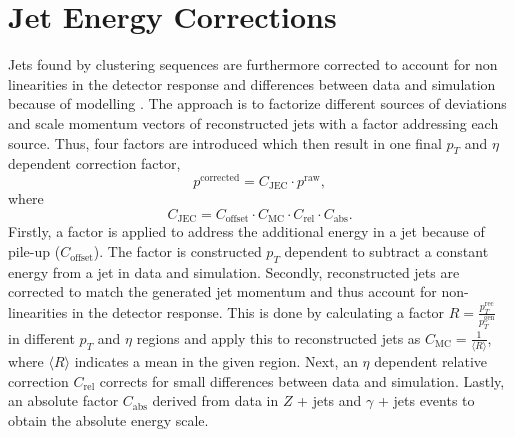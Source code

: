 \section{Jet Energy Corrections}
\label{sec:jec}
	Jets found by clustering sequences are furthermore corrected to account for non linearities in the detector response and differences between data and simulation because of modelling \cite{JEC}. The approach is to factorize different sources of deviations and scale momentum vectors of reconstructed jets with a factor addressing each source. Thus, four factors are introduced which then result in one final $p_T$ and $\eta$ dependent correction factor,
	\begin{equation}
	p^{\text{corrected}} = C_{\text{JEC}} \cdot p^{\text{raw}},
	\label{eq:jec}
	\end{equation}
	where
	\begin{equation}
	C_{\text{JEC}} = C_{\text{offset}} \cdot C_{\text{MC}} \cdot C_{\text{rel}} \cdot C_{\text{abs}}.
	\label{eq:cjec}
	\end{equation}
	Firstly, a factor is applied to address the additional energy in a jet because of pile-up ($C_{\text{offset}}$). The factor is constructed $p_T$ dependent to subtract a constant energy from a jet in data and simulation. Secondly, reconstructed jets are corrected to match the generated jet momentum and thus account for non-linearities in the detector response. This is done by calculating a factor $R=\frac{p_T^{\text{rec}}}{p_T^{\text{gen}}}$ in different $p_T$ and $\eta$ regions and apply this to reconstructed jets as $C_{\text{MC}} = \frac{1}{\langle R \rangle}$, where $\langle R \rangle$ indicates a mean in the given region. Next, an $\eta$ dependent relative correction $C_{\text{rel}}$ corrects for small differences between data and simulation. Lastly, an absolute factor $C_{\text{abs}}$ derived from data in $Z$ + jets and $\gamma$ + jets events to obtain the absolute energy scale.
	

